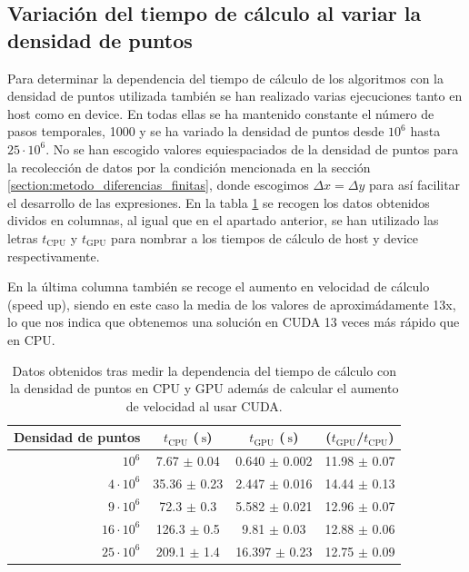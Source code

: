 \documentclass[11pt,a4paper,twoside,pdf]{article}
\numberwithin{equation}{section}
\begin{document}
\subsection{Variación del tiempo de cálculo al variar la densidad de puntos} 

Para determinar la dependencia del tiempo  de cálculo de los algoritmos con la densidad de puntos utilizada también se han realizado varias ejecuciones tanto en host como en device. En todas ellas se ha mantenido constante el número de pasos temporales, 1000 y se ha variado la densidad de puntos desde $10^6$ hasta $25\cdot 10^6$. No se han escogido valores equiespaciados de la densidad de puntos para la recolección de datos por la condición mencionada en la sección \ref{section:metodo_diferencias_finitas}, donde escogimos $\Delta x=\Delta y$ para así facilitar el desarrollo de las expresiones. En la tabla \ref{tab:t_densidad_de_punto} se recogen los datos obtenidos dividos en columnas, al igual que en el apartado anterior, se han utilizado las letras  $t_\text{CPU}$ y  $t_\text{GPU}$ para nombrar a los tiempos de cálculo de host y device respectivamente. 

En la última columna también se recoge el aumento en velocidad de cálculo (speed up), siendo en este caso la media de los valores de aproximádamente 13x, lo que nos indica que obtenemos una solución en CUDA 13 veces más rápido que en CPU.

\begin{table}[h]
    \centering
    \begin{tabular}{|r|c|c|c|}
    \hline
    Densidad de puntos &  $t_\text{CPU}$ ($\SI{}{\second}$)  & $t_\text{GPU}$ ($\SI{}{\second}$) &  ($t_\text{GPU}$/$t_\text{CPU}$)  \\ \hline \hline
     $10^6$ & 7.67 $\pm$ 0.04         & 0.640 $\pm$ 0.002 & 11.98 $\pm$ 0.07\\ \hline
     $4\cdot 10^6$ & 35.36 $\pm$ 0.23 & 2.447 $\pm$ 0.016 & 14.44 $\pm$ 0.13\\ \hline
     $9\cdot 10^6$ & 72.3 $\pm$ 0.3   & 5.582 $\pm$ 0.021   & 12.96 $\pm$ 0.07\\ \hline
     $16\cdot 10^6$ & 126.3 $\pm$ 0.5 & 9.81 $\pm$ 0.03   & 12.88 $\pm$ 0.06\\ \hline
     $25\cdot 10^6$ & 209.1 $\pm$ 1.4 & 16.397 $\pm$ 0.23 & 12.75 $\pm$ 0.09\\ \hline
    \end{tabular}
    \caption{Datos obtenidos tras medir la dependencia del tiempo de cálculo con la densidad de puntos en CPU y GPU además de calcular el aumento de velocidad al usar CUDA.}
    \label{tab:t_densidad_de_punto}
\end{table}
\end{document}
